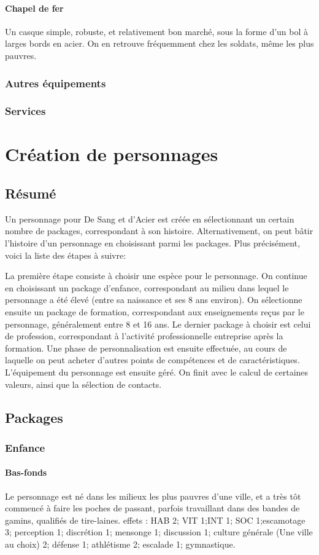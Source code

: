 \documentclass[10pt,a4paper,twocolumn]{book}
\begin{document}
\subsubsection{Chapel de fer}
Un casque simple, robuste, et relativement bon marché, sous la forme d'un bol à larges bords en acier. On en retrouve fréquemment chez les soldats, même les plus pauvres.
\subsection{Autres équipements}
\subsection{Services}

\chapter{Création de personnages}
\section{Résumé}
Un personnage pour De Sang et d’Acier est créée en sélectionnant un certain nombre de packages, correspondant à son histoire. Alternativement, on peut bâtir l’histoire d’un personnage en choisissant parmi les packages.
Plus précisément, voici la liste des étapes à suivre:

La première étape consiste à choisir une espèce pour le personnage.
On continue en choisissant un package d’enfance, correspondant au milieu dans lequel le personnage a été élevé (entre sa naissance et ses 8 ans environ).
On sélectionne ensuite un package de formation, correspondant aux enseignements reçus par le personnage, généralement entre 8 et 16 ans.
Le dernier package à choisir est celui de profession, correspondant à l’activité professionnelle entreprise après la formation.
Une phase de personnalisation est ensuite effectuée, au cours de laquelle on peut acheter d’autres points de compétences et de caractéristiques.
L’équipement du personnage est ensuite géré.
On finit avec le calcul de certaines valeurs, ainsi que la sélection de contacts.
\section{Packages}
\subsection{Enfance}
\subsubsection{Bas-fonds}
Le personnage est né dans les milieux les plus pauvres d’une ville, et a très tôt commencé à faire les poches de passant, parfois travaillant dans des bandes de gamins, qualifiés de tire-laines.
effets : HAB 2; VIT 1;INT 1; SOC 1;escamotage 3; perception 1; discrétion 1; mensonge 1; discussion 1; culture générale (Une ville au choix) 2; défense 1; athlétisme 2; escalade 1; gymnastique.
\end{document}
